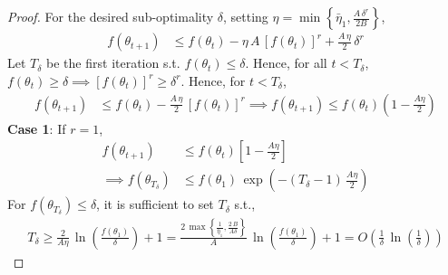 \documentclass{article}
\newcommand{\tht}{\theta_t}
\newcommand{\thtt}{\theta_{t+1}}
\begin{document}
\begin{proof}
For the desired sub-optimality $\delta$, setting $\eta = \min\left\{\bar{\eta}_1, \frac{A \, \delta^{r}}{2B} \right\}$,
\begin{align*}
f(\thtt) & \leq f(\tht) - \eta \, A \, [f(\tht)]^r + \frac{A \, \eta}{2} \, \delta^r    
\end{align*}
Let $T_\delta$ be the first iteration s.t. $f(\tht) \leq \delta$. Hence, for all $t < T_\delta$, $f(\tht) \geq \delta \implies [f(\tht)]^{r} \geq \delta^r$. Hence, for $t < T_\delta$, 
\begin{align}
f(\thtt) & \leq f(\tht) - \frac{A \, \eta}{2} \,  [f(\tht)]^r \implies f(\thtt) \leq f(\tht)\left(1-\frac{A\eta}{2}\right)
\label{eq:lemma-p2-sd-inter-1}
\end{align}
\textbf{Case 1}: If $r = 1$, 
\begin{align*}
f(\thtt) & \leq f(\tht) \left[1 - \frac{A \eta}{2} \right] \\
\implies f(\theta_{T_\delta}) & \leq f(\theta_1) \, \exp\left(-(T_\delta-1) \, \frac{A \eta}{2}\right)
\end{align*}
For $f(\theta_{T_\delta}) \leq \delta$, it is sufficient to set $T_\delta$ s.t., 
\begin{align*}    
T_\delta \geq \frac{2}{A \eta} \, \ln\left(\frac{f(\theta_1)}{\delta}\right) + 1 = \frac{2 \, \max\left\{\frac{1}{\bar{\eta}_1}, \frac{2 \, B}{A \delta}\right\}}{A} \, \ln\left(\frac{f(\theta_1)}{\delta}\right) + 1 = O\left(\frac{1}{\delta} \, \ln\left(\frac{1}{\delta} \right)\right)
\end{align*}


\end{proof}
\end{document}
